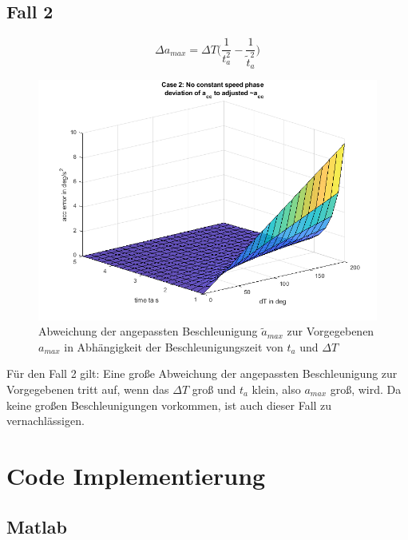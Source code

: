 \documentclass[a4paper, 10pt]{scrartcl}
\begin{document}
		\subsection{Fall 2}
			 \[\Delta a_{max} = \Delta T \bigg(\frac{1}{t_{a}^{2}} -  \frac{1}{\tilde{t}_{a}^{2}}\bigg)\]
			\begin{figure}[h!]
				\centering
				\includegraphics[width=0.9\linewidth]{./pics/err_acc_case2.png}
				\caption{Abweichung der angepassten Beschleunigung $ \tilde{a}_{max} $ zur Vorgegebenen $ a_{max} $ in Abhängigkeit der Beschleunigungszeit von $ t_{a} $ und $ \Delta T $}
			\end{figure}
			Für den Fall 2 gilt: Eine große Abweichung der angepassten Beschleunigung zur Vorgegebenen tritt auf, wenn das $ \Delta T $ groß und $ t_{a} $ klein, also $ a_{max} $ groß, wird. Da keine großen Beschleunigungen vorkommen, ist auch dieser Fall zu vernachlässigen.
			\pagebreak
		
	\section{Code Implementierung}
		\subsection{Matlab}
			
			
			
\end{document}
